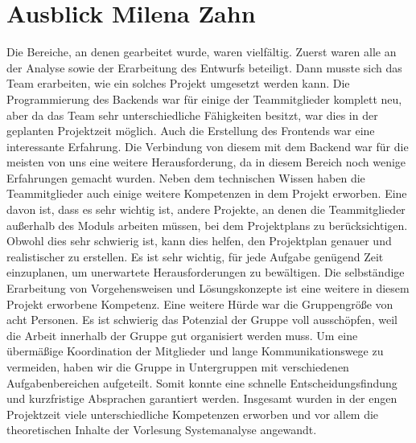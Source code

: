 	\section[Ausblick]{Ausblick {\hfill \normalsize Milena Zahn}}
	Die Bereiche, an denen gearbeitet wurde, waren vielfältig. Zuerst waren alle an der Analyse sowie der Erarbeitung des Entwurfs beteiligt. Dann musste sich das Team erarbeiten, wie ein solches Projekt umgesetzt werden kann. Die Programmierung des Backends war für einige der Teammitglieder komplett neu, aber da das Team sehr unterschiedliche Fähigkeiten besitzt, war dies in der geplanten Projektzeit möglich. Auch die Erstellung des Frontends war eine interessante Erfahrung. Die Verbindung von diesem mit dem Backend war für die meisten von uns eine weitere Herausforderung, da in diesem Bereich noch wenige Erfahrungen gemacht wurden. 
	Neben dem technischen Wissen haben die Teammitglieder auch einige weitere Kompetenzen in dem Projekt erworben. Eine davon ist, dass es sehr wichtig ist, andere Projekte, an denen die Teammitglieder außerhalb des Moduls arbeiten müssen, bei dem Projektplans zu berücksichtigen. Obwohl dies sehr schwierig ist, kann dies helfen, den Projektplan genauer und realistischer zu erstellen. Es ist sehr wichtig, für jede Aufgabe genügend Zeit einzuplanen, um unerwartete Herausforderungen zu bewältigen. Die selbständige Erarbeitung von Vorgehensweisen und Lösungskonzepte ist eine weitere in diesem Projekt erworbene Kompetenz.
	Eine weitere Hürde war die Gruppengröße von acht Personen. Es ist schwierig das Potenzial der Gruppe voll ausschöpfen, weil die Arbeit innerhalb der Gruppe gut organisiert werden muss.  Um eine übermäßige Koordination der Mitglieder und lange Kommunikationswege zu vermeiden, haben wir die Gruppe in Untergruppen mit verschiedenen Aufgabenbereichen aufgeteilt. Somit konnte eine schnelle Entscheidungsfindung und kurzfristige Absprachen garantiert werden. Insgesamt wurden in der engen Projektzeit viele unterschiedliche Kompetenzen erworben und vor allem die theoretischen Inhalte der Vorlesung Systemanalyse angewandt.
	